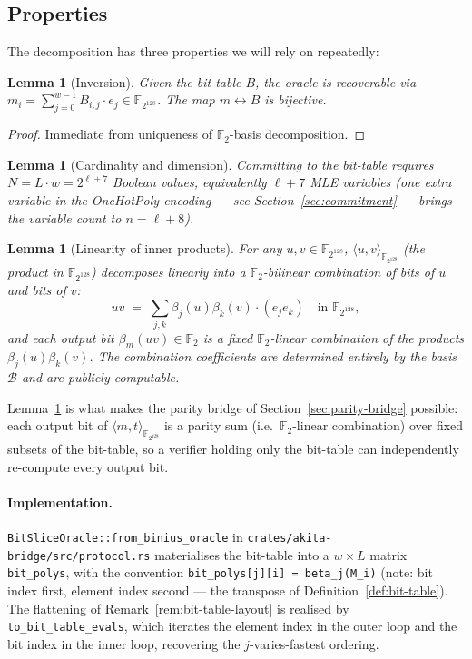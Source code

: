 \documentclass[11pt,a4paper]{article}
\newtheorem{lemma}[theorem]{Lemma}
\theoremstyle{definition}
\theoremstyle{remark}
\newcommand{\binF}{\mathbb{F}_{2^{128}}}        %
\newcommand{\GF}[1]{\mathbb{F}_{#1}}             %
\newcommand{\BitTable}{B}                         %
\newcommand{\Transparent}{t}                      %
\newcommand{\Message}{m}                          %
\begin{document}
\subsection{Properties}

The decomposition has three properties we will rely on repeatedly:

\begin{lemma}[Inversion]
\label{lem:bit-table-inversion}
Given the bit-table $\BitTable$, the oracle is recoverable via
$\Message_i = \sum_{j=0}^{w-1} \BitTable_{i,j} \cdot e_j \in \binF$.
The map $\Message \leftrightarrow \BitTable$ is bijective.
\end{lemma}
\begin{proof}
Immediate from uniqueness of $\GF{2}$-basis decomposition.
\end{proof}

\begin{lemma}[Cardinality and dimension]
\label{lem:bit-table-card}
Committing to the bit-table requires $N = L \cdot w = 2^{\ell + 7}$
Boolean values, equivalently $\ell + 7$ MLE variables (one extra
variable in the OneHotPoly encoding — see
Section~\ref{sec:commitment} — brings the variable count to $n = \ell
+ 8$).
\end{lemma}

\begin{lemma}[Linearity of inner products]
\label{lem:inner-product-bilinearity}
For any $u, v \in \binF$, $\langle u, v \rangle_{\binF}$ (the product
in $\binF$) decomposes \emph{linearly} into a $\GF{2}$-bilinear
combination of bits of $u$ and bits of $v$:
\[
  uv \;=\; \sum_{j, k} \beta_j(u) \beta_k(v) \cdot (e_j e_k)
  \quad \text{in } \binF,
\]
and each output bit $\beta_m(uv) \in \GF{2}$ is a fixed $\GF{2}$-linear
combination of the products $\beta_j(u) \beta_k(v)$. The combination
coefficients are determined entirely by the basis $\mathcal{B}$ and are
publicly computable.
\end{lemma}

Lemma~\ref{lem:inner-product-bilinearity} is what makes the parity
bridge of Section~\ref{sec:parity-bridge} possible: each output bit of
$\langle \Message, \Transparent \rangle_{\binF}$ is a parity sum (i.e.\
$\GF{2}$-linear combination) over fixed subsets of the bit-table, so a
verifier holding only the bit-table can independently re-compute every
output bit.

\paragraph{Implementation.}
\verb|BitSliceOracle::from_binius_oracle| in
\verb|crates/akita-bridge/src/protocol.rs| materialises the bit-table
into a $w \times L$ matrix \verb|bit_polys|, with the convention
\verb|bit_polys[j][i] = beta_j(M_i)| (note: bit index first, element
index second — the transpose of Definition~\ref{def:bit-table}). The
flattening of Remark~\ref{rem:bit-table-layout} is realised by
\verb|to_bit_table_evals|, which iterates the element index in the
outer loop and the bit index in the inner loop, recovering the
$j$-varies-fastest ordering.
\end{document}
